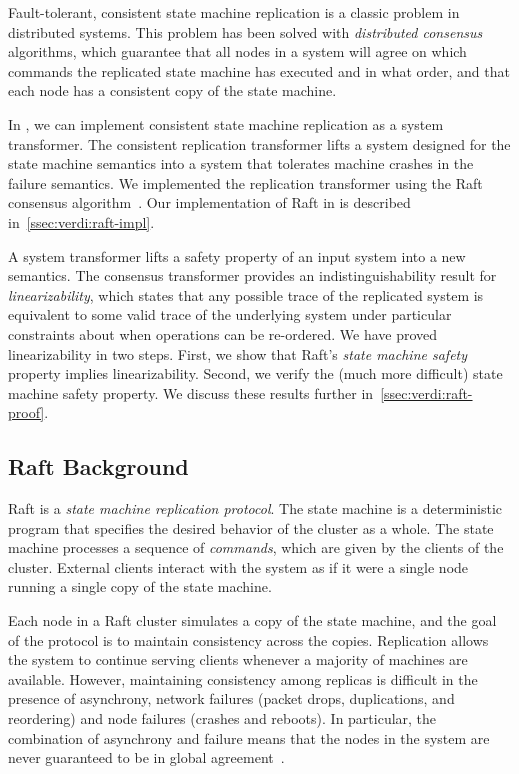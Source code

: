 Fault-tolerant, consistent state machine replication
is a classic problem in distributed systems.
This problem has been
solved with \textit{distributed consensus} algorithms, which guarantee
that all nodes in a system will agree on which commands the replicated
state machine has executed and in what order, and that each node has a
consistent copy of the state machine.

In \Verdi, we can implement consistent state machine replication as a
system transformer. The consistent replication transformer lifts a
system designed for the state machine semantics into a system that
tolerates machine crashes in the failure semantics. We implemented the
replication transformer using the Raft consensus
algorithm~\cite{ongaro:raft}. Our implementation of Raft in \Verdi is
described in~\cref{ssec:verdi:raft-impl}.

A \Verdi system transformer lifts a safety property of an input
system into a new semantics. The consensus transformer provides an
indistinguishability result for \textit{linearizability}, which states
that any possible trace of the replicated system is equivalent to some
valid trace of the underlying system under particular constraints
about when operations can be re-ordered. We have proved linearizability
in two steps. First, we show that Raft's
\textit{state machine safety} property implies linearizability.
Second, we verify the (much more difficult) state machine safety property.
We discuss these results further in~\cref{ssec:verdi:raft-proof}.

\subsection{Raft Background}\label{ssec:verdi:raft-background}

Raft is a \textit{state machine replication protocol}.
The state machine is a deterministic program that specifies
the desired behavior of the cluster as a whole.
The state machine processes a sequence of \emph{commands},
which are given by the clients of the cluster.
External clients interact with
the system as if it were a single node running
a single copy of the state machine.

Each node in a Raft cluster simulates a copy of the state machine,
and the goal of the protocol is to maintain consistency across the copies.
Replication allows the system to continue
serving clients whenever a majority of machines are available.
However, maintaining consistency among replicas
is difficult in the presence of asynchrony,
network failures (packet drops, duplications, and reordering)
and node failures (crashes and reboots).
In particular, the combination of asynchrony and failure means that
the nodes in the system are never guaranteed
to be in global agreement~\cite{flp}.

